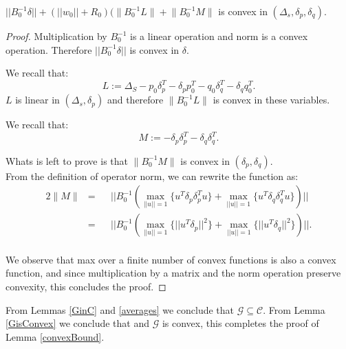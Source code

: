 \begin{lemma} \label{GisConvex}
$||B_0^{-1}\delta|| + (||w_0||+R_0)(\Big \|B_0^{-1}L\Big \|+\Big \|B_0^{-1}M\Big \|$ is convex in $(\Delta_s,\delta_p, \delta_q).$
\end{lemma}
\begin{proof}
Multiplication by $B_0^{-1}$ is a linear operation and norm is a convex
operation. Therefore $||B_0^{-1}\delta||$ is convex in $\delta$.

We recall that:
\begin{equation*}
L:= \Delta_S - p_0\delta_p^T - \delta_pp_0^T - q_0\delta_q^T - \delta_qq_0^T.
\end{equation*}
$L$ is linear in $(\Delta_s, \delta_p)$ and therefore $\Big \|B_0^{-1}L\Big \|$ is convex in these variables.


We recall that:
\begin{equation*}
M:= - \delta_p\delta_p^T - \delta_q\delta_q^T.
\end{equation*}

Whats is left to prove is that $\Big \|B_0^{-1}M\Big \|$ is convex in $(\delta_p, \delta_q)$.
\\From the definition of operator norm, we can rewrite the function as:
\begin{alignat*} {2}
\Big \|M \Big \| & = && ||B_0^{-1}(\max_{||u||=1}{\{u^T \delta_p\delta_p^T u\}} +
\max_{||u||=1}{\{u^T \delta_q\delta_q^T u\}})||\\
& = && ||B_0^{-1}(\max_{||u||=1}{\{||u^T \delta_p||^2\}} +
\max_{||u||=1}{\{||u^T \delta_q||^2\}})||.
\end{alignat*}
\\We observe that max over a finite number of convex functions is also a convex
function, and since multiplication by a matrix and the norm
operation preserve convexity, this concludes the proof.
\end{proof}

\begin{corollary}
From Lemmas \ref{GinC} and \ref{averages} we conclude that $\mathcal{G}\subseteq \mathcal{C}$. From Lemma \ref{GisConvex} we conclude that and $\mathcal{G}$ is convex, this completes the proof of Lemma \ref{convexBound}.
\end{corollary}



